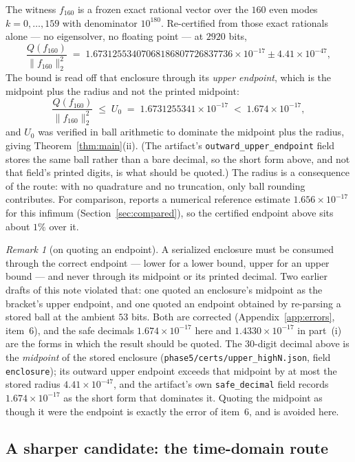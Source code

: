 \documentclass[11pt,a4paper]{article}
\theoremstyle{definition}
\theoremstyle{remark}
\newtheorem{remark}[theorem]{Remark}
\newcommand{\src}[1]{{\footnotesize\texttt{#1}}}
\begin{document}
The witness $f_{160}$ is a frozen exact rational vector over the $160$ even modes
$k = 0,\dots,159$ with denominator $10^{180}$. Re-certified from those exact
rationals alone --- no eigensolver, no floating point --- at $2920$ bits,
\[
  \frac{Q(f_{160})}{\|f_{160}\|_2^2}
  \;=\; 1.67312553407068186807726837736\times10^{-17} \pm 4.41\times10^{-47},
\]
The bound is read off that enclosure through its \emph{upper endpoint}, which is
the midpoint plus the radius and not the printed midpoint:
\[
  \frac{Q(f_{160})}{\|f_{160}\|_2^2}
  \;\le\; U_0 \;=\; 1.6731255341\times10^{-17}
  \;<\; 1.674\times10^{-17},
\]
and $U_0$ was verified in ball arithmetic to dominate the midpoint plus the
radius, giving Theorem~\ref{thm:main}(ii). (The artifact's
\src{outward\_upper\_endpoint} field stores the same ball rather than a bare
decimal, so the short form above, and not that field's printed digits, is what
should be quoted.) The radius is a consequence of the route:
with no quadrature and no truncation, only ball rounding contributes. For
comparison, \cite{Zhu} reports a numerical reference estimate
$1.656\times10^{-17}$ for this infimum (Section~\ref{sec:compared}), so the
certified endpoint above sits about $1\%$ over it.

\begin{remark}[on quoting an endpoint]
\label{rem:endpoint}
A serialized enclosure must be consumed through the correct endpoint --- lower
for a lower bound, upper for an upper bound --- and never through its midpoint
or its printed decimal. Two earlier drafts of this note violated that: one
quoted an enclosure's midpoint as the bracket's upper endpoint, and one quoted
an endpoint obtained by re-parsing a stored ball at the ambient $53$ bits. Both
are corrected (Appendix~\ref{app:errors}, item~6), and the safe decimals
$1.674\times10^{-17}$ here and $1.4330\times10^{-17}$ in part~(i) are the forms
in which the result should be quoted. The $30$-digit decimal above is the
\emph{midpoint} of the stored enclosure
(\src{phase5/certs/upper\_highN.json}, field \src{enclosure}); its outward upper
endpoint exceeds that midpoint by at most the stored radius
$4.41\times10^{-47}$, and the artifact's own \src{safe\_decimal} field records
$1.674\times10^{-17}$ as the short form that dominates it. Quoting the midpoint
as though it were the endpoint is exactly the error of item~6, and is avoided
here.
\end{remark}

\subsection{A sharper candidate: the time-domain route}
\label{sec:timedomain}
\end{document}
